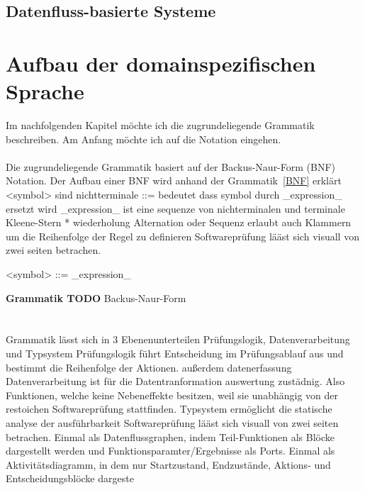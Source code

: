 \documentclass{article}
\begin{document}
    \subsection{Datenfluss-basierte Systeme}
    \newpage
    \section{Aufbau der domainspezifischen Sprache}
    Im nachfolgenden Kapitel möchte ich die zugrundeliegende Grammatik beschreiben. Am Anfang möchte ich auf die Notation eingehen.\\\\
    Die zugrundeliegende Grammatik basiert auf der Backus-Naur-Form (BNF) Notation. Der Aufbau einer BNF wird anhand der Grammatik~\ref{BNF} erklärt
    <symbol> sind nichtterminale
    ::= bedeutet dass symbol durch _expression_ ersetzt wird
    _expression_ ist eine sequenze von nichterminalen und terminale
    Kleene-Stern * wiederholung
    Alternation \textbar  oder
    Sequenz erlaubt auch Klammern um die Reihenfolge der Regel zu definieren
    Softwareprüfung lääst sich visuall von zwei seiten betrachen. 
    \begin{grammar}
        <symbol> ::= _expression_
    \end{grammar}
    \textbf{Grammatik TODO} Backus-Naur-Form\\\\\\
    \label{BNF}
    Grammatik lässt sich in 3 Ebenenunterteilen Prüfungslogik, Datenverarbeitung und Typsystem
    Prüfungslogik führt Entscheidung im Prüfungsablauf aus und bestimmt die Reihenfolge der Aktionen. außerdem datenerfassung
    Datenverarbeitung ist für die Datentranformation auswertung zustädnig. Also Funktionen, welche keine Nebeneffekte besitzen, weil sie unabhängig von der restoichen Softwareprüfung stattfinden.
    Typsystem ermöglicht die statische analyse der ausführbarkeit
    Softwareprüfung lääst sich visuall von zwei seiten betrachen. 
    Einmal als Datenflussgraphen, indem Teil-Funktionen als Blöcke dargestellt werden und Funktionsparamter/Ergebnisse als Ports.
    Einmal als Aktivitätsdiagramm, in dem nur Startzustand, Endzustände, Aktions- und Entscheidungsblöcke dargeste
\end{document}
